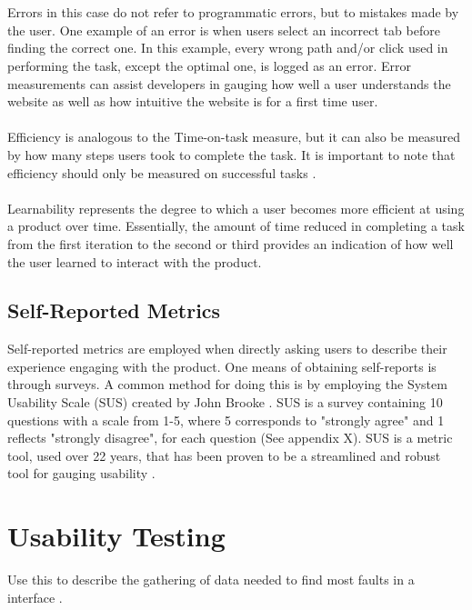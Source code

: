 \\\\
Errors in this case do not refer to programmatic errors, but to mistakes made by the user. One example of an error is when users select an incorrect tab before finding the correct one. In this example, every wrong path and/or click used in performing the task, except the optimal one, is logged as an error. Error measurements can assist developers in gauging how well a user understands the website as well as how intuitive the website is for a first time user. 
\\\\
Efficiency is analogous to the Time-on-task measure, but it can also be measured by how many steps users took to complete the task. It is important to note that efficiency should only be measured on successful tasks \cite{tullis_albert_2011}.
\\\\
Learnability represents the degree to which a user becomes more efficient at using a product over time. Essentially, the amount of time reduced in completing a task from the first iteration to the second or third provides an indication of how well the user learned to interact with the product. 
\subsection{Self-Reported Metrics}
Self-reported metrics are employed when directly asking users to describe their experience engaging with the product. One means of obtaining self-reports is through surveys. A common method for doing this is by employing the System Usability Scale (SUS) created by John Brooke \cite{tullis_albert_2011} \cite{brooke1996sus}. SUS is a survey containing 10 questions with a scale from 1-5, where 5 corresponds to "strongly agree" and 1 reflects "strongly disagree", for each question (See appendix X). SUS is a metric tool, used over 22 years, that has been proven to be a streamlined and robust tool for gauging usability \cite{brooke1996sus}. 

\section{Usability Testing}
 Use this to describe the gathering of data needed to find most faults in a interface \cite{tullis_albert_2011}. 

